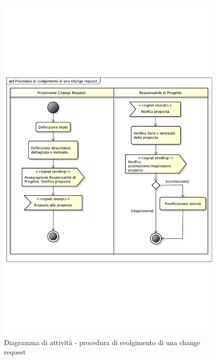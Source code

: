 				\begin{figure}[htbp]
					\centering
					\includegraphics[width=14cm]{images/proc_change_request.pdf}
					\caption{Diagramma di attività - procedura di svolgimento di una change request}
					\label{fig:procedura_generazione_change_request}		
				\end{figure}
				
					
